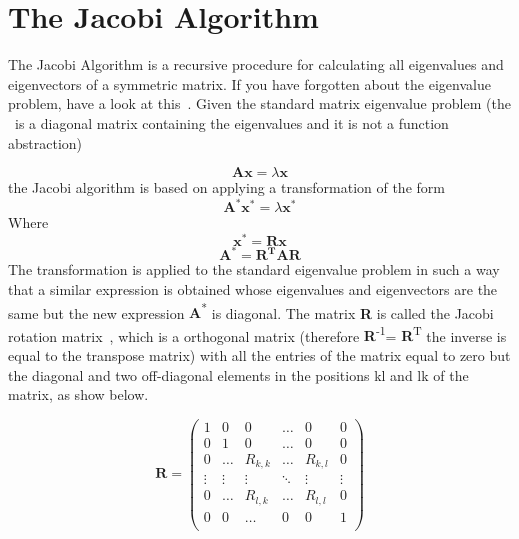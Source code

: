 \documentclass{tmr}
\begin{document}
\section{The Jacobi Algorithm}

The Jacobi Algorithm is a recursive procedure for calculating all
eigenvalues and eigenvectors of a symmetric matrix.
%
If you have forgotten about the eigenvalue problem,
 have a look at this~\cite{eigenvalue}. Given the standard matrix eigenvalue problem 
(the \textlambda\ is a diagonal matrix containing the eigenvalues and it is not a function
abstraction)

\[\mathbf{Ax} = \lambda \mathbf{x}  \]
the Jacobi algorithm is based on applying a transformation of the form 
 \[\mathbf{A^*x^*} = \lambda \mathbf{x^*}  \]
Where
\[\mathbf{x^*} = \mathbf{Rx} \]
\[\mathbf{A^*} = \mathbf{R^TAR} \]
The transformation is applied to the standard eigenvalue problem
in such a way that a similar expression is obtained whose 
eigenvalues and eigenvectors are the same but the
new expression {\textbf A\textsuperscript{*}} is diagonal. The matrix {\bf R} 
is called the Jacobi rotation matrix~\cite{Jacobi},
which is a orthogonal matrix (therefore {\textbf R\textsuperscript{-1}}= {\textbf R\textsuperscript{T}} the
inverse is equal to the transpose matrix) with all the entries of the matrix equal
 to zero but the diagonal and two off-diagonal elements
in the positions kl and lk of the matrix, as show below.

\[
 \mathbf{R} =
\begin{pmatrix}
1 & 0 & 0 & \hdots & 0 & 0 \\
0 & 1 & 0 & \hdots & 0 & 0 \\
0 & \hdots & R_{k,k} & \hdots & R_{k,l} &  0 \\ 
\vdots & \vdots & \vdots & \ddots & \vdots & \vdots \\
0 &  \hdots & R_{l,k} & \hdots & R_{l,l} & 0 \\
0 & 0 & \hdots & 0 & 0 & 1 \\ 
\end{pmatrix}
\]
\end{document}
